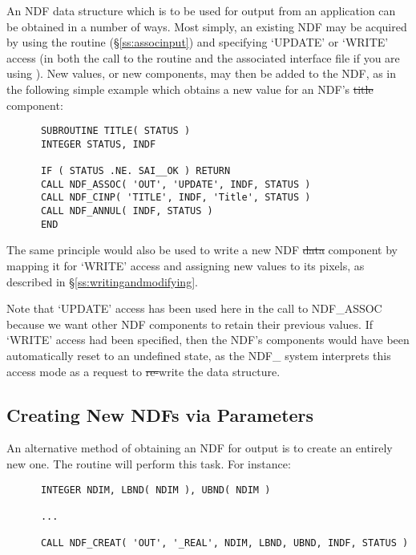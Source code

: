 An NDF data structure which is to be used for output from an application can
be obtained in a number of ways. 
Most simply, an existing NDF may be acquired by using the  routine
(\S\ref{ss:associnput}) and specifying `UPDATE' or `WRITE' access (in both the
call to the routine and the associated interface file if you are using
).
New values, or new components, may then be added to the NDF, as in the
following simple example which obtains a new value for an NDF's \st{title\/}
component: 

\small
\begin{verbatim}
      SUBROUTINE TITLE( STATUS )
      INTEGER STATUS, INDF

      IF ( STATUS .NE. SAI__OK ) RETURN
      CALL NDF_ASSOC( 'OUT', 'UPDATE', INDF, STATUS )
      CALL NDF_CINP( 'TITLE', INDF, 'Title', STATUS )
      CALL NDF_ANNUL( INDF, STATUS )
      END
\end{verbatim}
\normalsize

The same principle would also be used to write a new NDF \st{data\/}
component by mapping it for `WRITE' access and assigning new values to its
pixels, as described in \S\ref{ss:writingandmodifying}. 

Note that `UPDATE' access has been used here in the call to NDF\_ASSOC
because we want other NDF components to retain their previous values. 
If `WRITE' access had been specified, then the NDF's components would have
been automatically reset to an undefined state, as the NDF\_ system
interprets this access mode as a request to \st{re-\/}write the data
structure. 

\subsection{\label{ss:creatingndfs}Creating New NDFs via Parameters}

An alternative method of obtaining an NDF for output is to create an
entirely new one. 
The  routine will perform this task.
For instance:

\small
\begin{verbatim}
      INTEGER NDIM, LBND( NDIM ), UBND( NDIM )

      ...

      CALL NDF_CREAT( 'OUT', '_REAL', NDIM, LBND, UBND, INDF, STATUS )
\end{verbatim}
\normalsize

